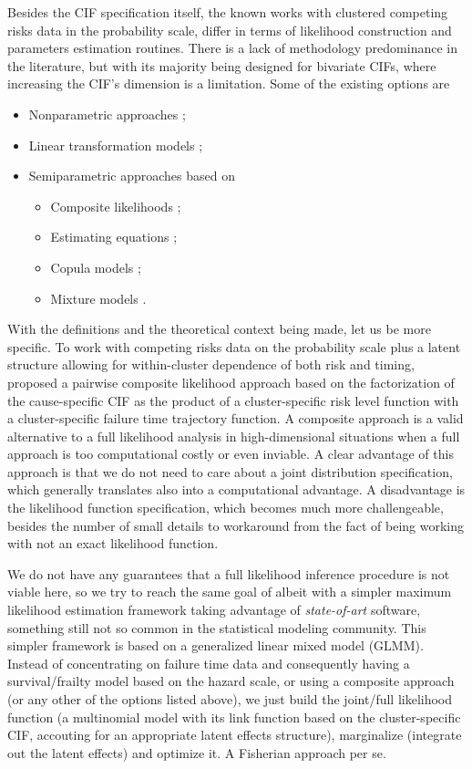 Besides the CIF specification itself, the known works with clustered
competing risks data in the probability scale, differ in terms of
likelihood construction and parameters estimation routines. There is a
lack of methodology predominance in the literature, but with its
majority being designed for bivariate CIFs, where increasing the CIF's
dimension is a limitation. Some of the existing options are
\begin{itemize}
 \item Nonparametric approaches \cite{cheng07,cheng09};
 \item Linear transformation models \cite{fine99,gerds12};
 \item Semiparametric approaches based on
  \begin{itemize}
   \item Composite likelihoods \cite{shih,SCHEIKE};
   \item Estimating equations \cite{cheng&fine12,crossoddsratioSCHEIKE};
   \item Copula models \cite{semiparametricSCHEIKE};
   \item Mixture models \cite{naskar05,shi13}.
  \end{itemize}
\end{itemize}

With the definitions and the theoretical context being made, let us be
more specific. To work with competing risks data on the probability
scale plus a latent structure allowing for within-cluster dependence of
both risk and timing,  proposed a pairwise composite
likelihood approach based on the factorization of the cause-specific CIF
as the product of a cluster-specific risk level function with a
cluster-specific failure time trajectory function. A composite approach
\cite{lindsay88, cox&reid04, varin11} is a valid alternative to a full
likelihood analysis in high-dimensional situations when a full approach
is too computational costly or even inviable. A clear advantage of this
approach is that we do not need to care about a joint distribution
specification, which generally translates also into a computational
advantage. A disadvantage is the likelihood function specification,
which becomes much more challengeable, besides the number of small
details to workaround from the fact of being working with not an exact
likelihood function.

We do not have any guarantees that a full likelihood inference procedure
is not viable here, so we try to reach the same goal of
 albeit with a simpler maximum likelihood estimation
framework taking advantage of \textit{state-of-art} software, something
still not so common in the statistical modeling community. This simpler
framework is based on a generalized linear mixed model (GLMM). Instead
of concentrating on failure time data and consequently having a
survival/frailty model based on the hazard scale, or using a composite
approach (or any other of the options listed above), we just build the
joint/full likelihood function (a multinomial model with its link
function based on the cluster-specific CIF, accouting for an appropriate
latent effects structure), marginalize (integrate out the latent
effects) and optimize it. A Fisherian approach per se.

